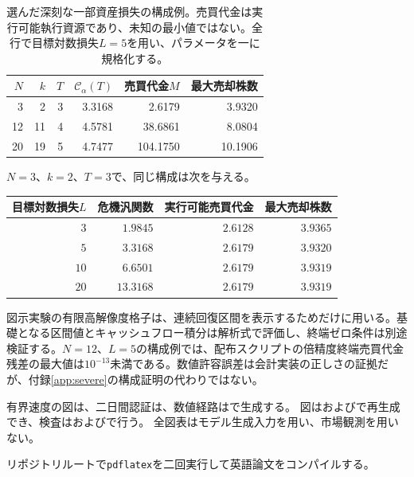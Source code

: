\documentclass[11pt]{article}
\numberwithin{equation}{section}
\theoremstyle{definition}
\theoremstyle{remark}
\begin{document}
\begin{table}[H]\centering\small
\caption{選んだ深刻な一部資産損失の構成例。売買代金は実行可能執行資源であり、未知の最小値ではない。全行で目標対数損失$L=5$を用い、パラメータを一に規格化する。}\label{tab:witness}
\begin{tabular}{@{}rrrrrr@{}}\toprule
$N$ & $k$ & $T$ & $\mathcal C_\alpha(T)$ & 売買代金$M$ & 最大売却株数 \\\midrule
 3  &  2  &  3  &  3.3168  &  2.6179  &  3.9320 \\
 12  &  11  &  4  &  4.5781  &  38.6861  &  8.0804 \\
 20  &  19  &  5  &  4.7477  &  104.1750  &  10.1906 \\
\bottomrule\end{tabular}
\end{table}


$N=3$、$k=2$、$T=3$で、同じ構成は次を与える。
\begin{center}\small
\begin{tabular}{@{}rrrr@{}}\toprule
目標対数損失$L$ & 危機汎関数 & 実行可能売買代金 & 最大売却株数\\\midrule
$3$ & $1.9845$ & $2.6128$ & $3.9365$\\
 $5$ & $3.3168$ & $2.6179$ & $3.9320$\\
$10$ & $6.6501$ & $2.6179$ & $3.9319$\\
$20$ & $13.3168$ & $2.6179$ & $3.9319$\\
\bottomrule\end{tabular}
\end{center}
図示実験の有限高解像度格子は、連続回復区間を表示するためだけに用いる。基礎となる区間値とキャッシュフロー積分は解析式で評価し、終端ゼロ条件は別途検証する。$N=12$、$L=5$の構成例では、配布スクリプトの倍精度終端売買代金残差の最大値は$10^{-13}$未満である。数値許容誤差は会計実装の正しさの証拠だが、付録\ref{app:severe}の構成証明の代わりではない。

\begingroup\sloppy
有界速度の図は、二日間認証は、数値経路はで生成する。
図はおよびで再生成でき、検査はおよびで行う。
全図表はモデル生成入力を用い、市場観測を用いない。\par\endgroup
リポジトリルートで\texttt{pdflatex}を二回実行して英語論文をコンパイルする。
\end{document}
